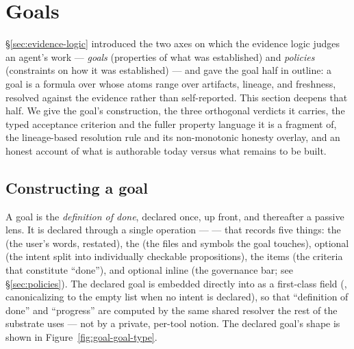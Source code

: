 \section{Goals}\label{sec:goals}

\S\ref{sec:evidence-logic} introduced the two axes on which the evidence logic judges an agent's
work --- \emph{goals} (properties of what was established) and \emph{policies} (constraints on how it
was established) --- and gave the goal half in outline: a goal is a formula over \trace{} whose atoms
range over artifacts, lineage, and freshness, resolved against the evidence rather than self-reported.
This section deepens that half. We give the goal's construction, the three orthogonal verdicts it
carries, the typed acceptance criterion and the fuller property language it is a fragment of, the
lineage-based resolution rule and its non-monotonic honesty overlay, and an honest account of what is
authorable today versus what remains to be built.

\subsection{Constructing a goal}\label{sec:goals-construction}

A goal is the \emph{definition of done}, declared once, up front, and thereafter a passive lens. It is
declared through a single operation ---  --- that records five things:
the  (the user's words, restated), the  (the files and symbols the goal
touches), optional  (the intent split into individually checkable propositions),
the  items (the criteria that constitute ``done''), and optional inline
 (the governance bar; see \S\ref{sec:policies}). The declared goal is embedded directly
into \trace{} as a first-class field (, canonicalizing to the empty list when no intent is
declared), so that ``definition of done'' and ``progress'' are computed by the same shared resolver
the rest of the substrate uses --- not by a private, per-tool notion. The declared goal's shape is
shown in Figure~\ref{fig:goal-goal-type}.

